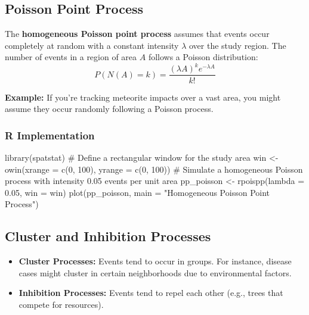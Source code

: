 \documentclass[
  11pt,
]{report}
\newenvironment{Shaded}{\begin{snugshade}}{\end{snugshade}}
\newcommand{\AttributeTok}[1]{\textcolor[rgb]{0.40,0.45,0.13}{#1}}
\newcommand{\CommentTok}[1]{\textcolor[rgb]{0.37,0.37,0.37}{#1}}
\newcommand{\DecValTok}[1]{\textcolor[rgb]{0.68,0.00,0.00}{#1}}
\newcommand{\FloatTok}[1]{\textcolor[rgb]{0.68,0.00,0.00}{#1}}
\newcommand{\FunctionTok}[1]{\textcolor[rgb]{0.28,0.35,0.67}{#1}}
\newcommand{\NormalTok}[1]{\textcolor[rgb]{0.00,0.23,0.31}{#1}}
\newcommand{\OtherTok}[1]{\textcolor[rgb]{0.00,0.23,0.31}{#1}}
\newcommand{\StringTok}[1]{\textcolor[rgb]{0.13,0.47,0.30}{#1}}
\providecommand{\tightlist}{%
  \setlength{\itemsep}{0pt}\setlength{\parskip}{0pt}}\usepackage{longtable,booktabs,array}
\begin{document}
\subsection{Poisson Point Process}\label{poisson-point-process}

The \textbf{homogeneous Poisson point process} assumes that events occur
completely at random with a constant intensity \(\lambda\) over the
study region. The number of events in a region of area \(A\) follows a
Poisson distribution: \[
P(N(A) = k) = \frac{(\lambda A)^k e^{-\lambda A}}{k!}
\]

\textbf{Example:} If you're tracking meteorite impacts over a vast area,
you might assume they occur randomly following a Poisson process.

\subsubsection{R Implementation}\label{r-implementation}

\begin{Shaded}
\begin{Highlighting}[]
\FunctionTok{library}\NormalTok{(spatstat)}
\CommentTok{\# Define a rectangular window for the study area}
\NormalTok{win }\OtherTok{\textless{}{-}} \FunctionTok{owin}\NormalTok{(}\AttributeTok{xrange =} \FunctionTok{c}\NormalTok{(}\DecValTok{0}\NormalTok{, }\DecValTok{100}\NormalTok{), }\AttributeTok{yrange =} \FunctionTok{c}\NormalTok{(}\DecValTok{0}\NormalTok{, }\DecValTok{100}\NormalTok{))}
\CommentTok{\# Simulate a homogeneous Poisson process with intensity 0.05 events per unit area}
\NormalTok{pp\_poisson }\OtherTok{\textless{}{-}} \FunctionTok{rpoispp}\NormalTok{(}\AttributeTok{lambda =} \FloatTok{0.05}\NormalTok{, }\AttributeTok{win =}\NormalTok{ win)}
\FunctionTok{plot}\NormalTok{(pp\_poisson, }\AttributeTok{main =} \StringTok{"Homogeneous Poisson Point Process"}\NormalTok{)}
\end{Highlighting}
\end{Shaded}

\subsection{Cluster and Inhibition
Processes}\label{cluster-and-inhibition-processes}

\begin{itemize}
\tightlist
\item
  \textbf{Cluster Processes:} Events tend to occur in groups. For
  instance, disease cases might cluster in certain neighborhoods due to
  environmental factors.
\item
  \textbf{Inhibition Processes:} Events tend to repel each other (e.g.,
  trees that compete for resources).
\end{itemize}
\end{document}
